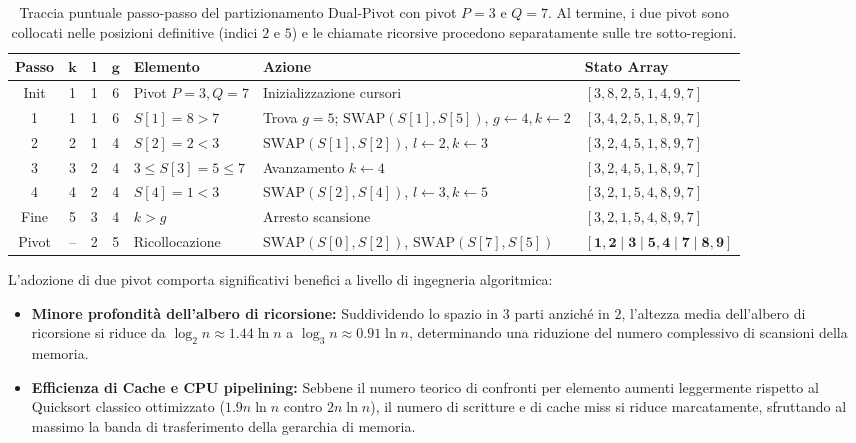 \begin{table}[H]
  \centering
  \small
  \begin{tabularx}{\textwidth}{c c c c >{\centering\arraybackslash}p{2.6cm} >{\raggedright\arraybackslash}X >{\centering\arraybackslash}p{3.2cm}}
    \toprule
    \textbf{Passo} & $\boldsymbol{k}$ & $\boldsymbol{l}$ & $\boldsymbol{g}$ & \textbf{Elemento} & \textbf{Azione} & \textbf{Stato Array} \\
    \midrule
    Init & 1 & 1 & 6 & Pivot $P=3, Q=7$ & Inizializzazione cursori & $[3, 8, 2, 5, 1, 4, 9, 7]$ \\
    1 & 1 & 1 & 6 & $S[1]=8 > 7$ & Trova $g=5$; $\text{SWAP}(S[1], S[5])$, $g \leftarrow 4, k \leftarrow 2$ & $[3, 4, 2, 5, 1, 8, 9, 7]$ \\
    2 & 2 & 1 & 4 & $S[2]=2 < 3$ & $\text{SWAP}(S[1], S[2])$, $l \leftarrow 2, k \leftarrow 3$ & $[3, 2, 4, 5, 1, 8, 9, 7]$ \\
    3 & 3 & 2 & 4 & $3 \le S[3]=5 \le 7$ & Avanzamento $k \leftarrow 4$ & $[3, 2, 4, 5, 1, 8, 9, 7]$ \\
    4 & 4 & 2 & 4 & $S[4]=1 < 3$ & $\text{SWAP}(S[2], S[4])$, $l \leftarrow 3, k \leftarrow 5$ & $[3, 2, 1, 5, 4, 8, 9, 7]$ \\
    \midrule
    Fine & 5 & 3 & 4 & $k > g$ & Arresto scansione & $[3, 2, 1, 5, 4, 8, 9, 7]$ \\
    Pivot & -- & 2 & 5 & Ricollocazione & $\text{SWAP}(S[0], S[2])$, $\text{SWAP}(S[7], S[5])$ & $\mathbf{[1, 2 \mid 3 \mid 5, 4 \mid 7 \mid 8, 9]}$ \\
    \bottomrule
  \end{tabularx}
  \caption{Traccia puntuale passo-passo del partizionamento Dual-Pivot con pivot $P = 3$ e $Q = 7$. Al termine, i due pivot sono collocati nelle posizioni definitive (indici $2$ e $5$) e le chiamate ricorsive procedono separatamente sulle tre sotto-regioni.}
  \label{tab:dual-pivot-execution-trace}
\end{table}

\FloatBarrier

\begin{property}
L'adozione di due pivot comporta significativi benefici a livello di ingegneria algoritmica:
\begin{itemize}
  \item \textbf{Minore profondità dell'albero di ricorsione:} Suddividendo lo spazio in $3$ parti anziché in $2$, l'altezza media dell'albero di ricorsione si riduce da $\log_2 n \approx 1.44 \ln n$ a $\log_3 n \approx 0.91 \ln n$, determinando una riduzione del numero complessivo di scansioni della memoria.
  \item \textbf{Efficienza di Cache e CPU pipelining:} Sebbene il numero teorico di confronti per elemento aumenti leggermente rispetto al Quicksort classico ottimizzato ($1.9 n \ln n$ contro $2 n \ln n$), il numero di scritture e di cache miss si riduce marcatamente, sfruttando al massimo la banda di trasferimento della gerarchia di memoria.
\end{itemize}
\end{property}

